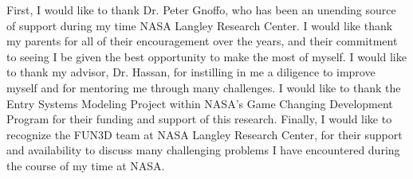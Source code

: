\begin{acknowledgements}
First, I would like to thank Dr. Peter Gnoffo, who has been an unending source
of support during my time NASA Langley Research Center.  I would like thank my
parents for all of their encouragement over the years, and their commitment to
seeing I be given the best opportunity to make the most of myself.  I would like
to thank my advisor, Dr. Hassan, for instilling in me a diligence to improve
myself and for mentoring me through many challenges.  I would like to thank the
Entry Systems Modeling Project within NASA's Game Changing Development Program
for their funding and support of this research.  Finally, I would like to
recognize the FUN3D team at NASA Langley Research Center, for their support and
availability to discuss many challenging problems I have encountered during the
course of my time at NASA.
\end{acknowledgements}

\thesistableofcontents

\thesislistoftables

\thesislistoffigures
